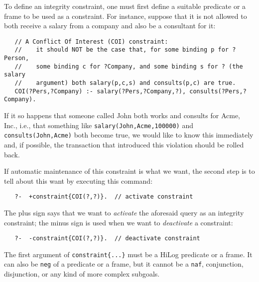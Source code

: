 To define an integrity constraint, one must first define a suitable 
predicate or a frame to be used as a constraint.
For instance, suppose that it is not allowed to both receive a salary from a
company and also be a consultant for it:
\begin{verbatim}
   // A Conflict Of Interest (COI) constraint:
   //    it should NOT be the case that, for some binding p for ?Person,
   //    some binding c for ?Company, and some binding s for ? (the salary
   //    argument) both salary(p,c,s) and consults(p,c) are true.
   COI(?Pers,?Company) :- salary(?Pers,?Company,?), consults(?Pers,?Company).
\end{verbatim}
If it so happens that someone called John both works and consults for
Acme, Inc., i.e., that something like \texttt{salary(John,Acme,100000)}  
and \texttt{consults(John,Acme)} both become true, we would like to know
this immediately and, if possible, the transaction that introduced this
violation should be rolled back.

If automatic maintenance of this constraint is what we want, the second step
is to tell \ERGO about this want by executing this command:
\begin{verbatim}
   ?-  +constraint{COI(?,?)}.  // activate constraint
\end{verbatim}
The plus sign says that we want to \emph{activate} the aforesaid query as an
integrity constraint; the minus sign is used when we want to
\emph{deactivate}  a constraint:
\begin{verbatim}
   ?-  -constraint{COI(?,?)}.  // deactivate constraint
\end{verbatim}
The first argument of \texttt{constraint\{...\}} must be a HiLog predicate
or a frame. It can also be \texttt{\bs{}neg} of a predicate or a frame, but
it cannot be a \texttt{\bs{}naf}, conjunction, disjunction, or any kind of
more complex subgoals.

